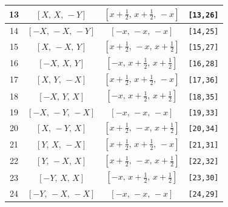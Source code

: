 \documentclass[fleqn,8pt]{jsarticle}
\begin{document}
\begin{longtable}{cccc}
13 & $\left[ X,\, X,\, - Y \right]$ & $\left[ x + \frac{1}{2},\, x + \frac{1}{2},\, - x \right]$ & {\tt [13,26]} \\ \hline
14 & $\left[ - X,\, - X,\, - Y \right]$ & $\left[ - x,\, - x,\, - x \right]$ & {\tt [14,25]} \\ \hline
15 & $\left[ X,\, - X,\, Y \right]$ & $\left[ x + \frac{1}{2},\, - x,\, x + \frac{1}{2} \right]$ & {\tt [15,27]} \\ \hline
16 & $\left[ - X,\, X,\, Y \right]$ & $\left[ - x,\, x + \frac{1}{2},\, x + \frac{1}{2} \right]$ & {\tt [16,28]} \\ \hline
17 & $\left[ X,\, Y,\, - X \right]$ & $\left[ x + \frac{1}{2},\, x + \frac{1}{2},\, - x \right]$ & {\tt [17,36]} \\ \hline
18 & $\left[ - X,\, Y,\, X \right]$ & $\left[ - x,\, x + \frac{1}{2},\, x + \frac{1}{2} \right]$ & {\tt [18,35]} \\ \hline
19 & $\left[ - X,\, - Y,\, - X \right]$ & $\left[ - x,\, - x,\, - x \right]$ & {\tt [19,33]} \\ \hline
20 & $\left[ X,\, - Y,\, X \right]$ & $\left[ x + \frac{1}{2},\, - x,\, x + \frac{1}{2} \right]$ & {\tt [20,34]} \\ \hline
21 & $\left[ Y,\, X,\, - X \right]$ & $\left[ x + \frac{1}{2},\, x + \frac{1}{2},\, - x \right]$ & {\tt [21,31]} \\ \hline
22 & $\left[ Y,\, - X,\, X \right]$ & $\left[ x + \frac{1}{2},\, - x,\, x + \frac{1}{2} \right]$ & {\tt [22,32]} \\ \hline
23 & $\left[ - Y,\, X,\, X \right]$ & $\left[ - x,\, x + \frac{1}{2},\, x + \frac{1}{2} \right]$ & {\tt [23,30]} \\ \hline
24 & $\left[ - Y,\, - X,\, - X \right]$ & $\left[ - x,\, - x,\, - x \right]$ & {\tt [24,29]} \\
\end{longtable}
\renewcommand{\arraystretch}{1.2}
\end{document}
